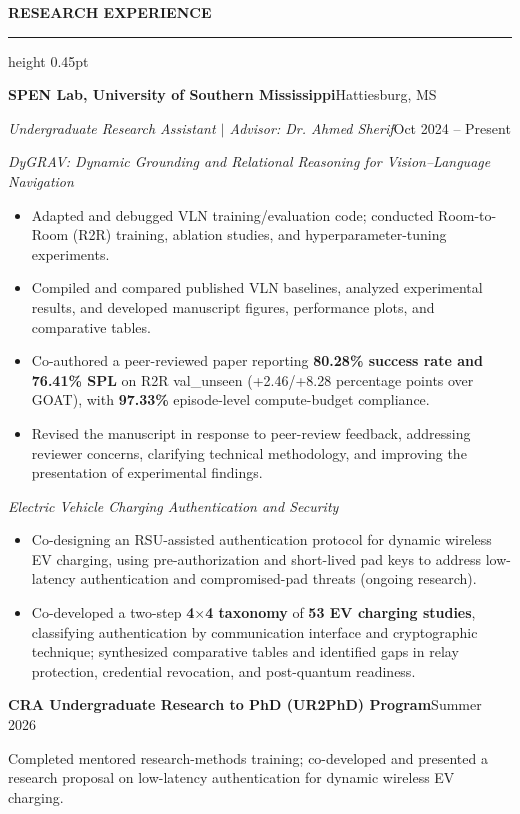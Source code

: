 \documentclass[11pt]{article}
\newcommand{\cvsection}[1]{%
  \Needspace{4\baselineskip}%
  \par\addvspace{8.5pt}%
  \noindent\textbf{\MakeUppercase{#1}}\par\nobreak
  \vspace{2pt}\hrule height 0.45pt\relax\nobreak\vspace{4pt}%
}
\newcommand{\entryheading}[4]{%
  \textbf{#1}\hfill #2\par
  \textit{#3}\hfill #4\par
}
\newcommand{\subentry}[2]{\par\noindent\textbf{#1}\hfill #2\par}
\newcommand{\researchtopic}[1]{\par\vspace{3pt}\noindent\textit{#1}\par}
\begin{document}
\cvsection{Research Experience}
\entryheading{SPEN Lab, University of Southern Mississippi}{Hattiesburg, MS}
  {Undergraduate Research Assistant $\vert$ Advisor: Dr. Ahmed Sherif}{Oct 2024 -- Present}
\researchtopic{DyGRAV: Dynamic Grounding and Relational Reasoning for Vision--Language Navigation}
\begin{itemize}
  \item Adapted and debugged VLN training/evaluation code; conducted Room-to-Room (R2R)
  training, ablation studies, and hyperparameter-tuning experiments.
  \item Compiled and compared published VLN baselines, analyzed experimental results,
  and developed manuscript figures, performance plots, and comparative tables.
  \item Co-authored a peer-reviewed paper reporting \textbf{80.28\% success rate and 76.41\% SPL} on
  R2R val\_unseen (+2.46/+8.28 percentage points over GOAT), with
  \textbf{97.33\%} episode-level compute-budget compliance.
  \item Revised the manuscript in response to peer-review feedback, addressing reviewer concerns, clarifying technical methodology, and improving the presentation of experimental findings.

\end{itemize}
\researchtopic{Electric Vehicle Charging Authentication and Security}
\begin{itemize}
  \item Co-designing an RSU-assisted authentication protocol for dynamic wireless EV
  charging, using pre-authorization and short-lived pad keys to address low-latency
  authentication and compromised-pad threats (ongoing research).
  \item Co-developed a two-step \textbf{4$\times$4 taxonomy} of \textbf{53 EV charging studies},
  classifying authentication by communication interface and cryptographic technique;
  synthesized comparative tables and identified gaps in relay protection, credential
  revocation, and post-quantum readiness.
\end{itemize}
\vspace{2pt}
\subentry{CRA Undergraduate Research to PhD (UR2PhD) Program}{Summer 2026}
Completed mentored research-methods training; co-developed and presented a research
proposal on low-latency authentication for dynamic wireless EV charging.
\end{document}
